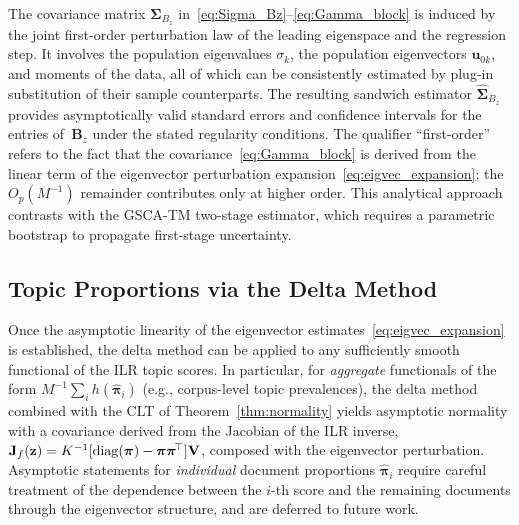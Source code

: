 \begin{remark}
\label{rem:no_bootstrap}
The covariance matrix $\boldsymbol{\Sigma}_{B_z}$
in~\eqref{eq:Sigma_Bz}--\eqref{eq:Gamma_block} is induced by the
joint first-order perturbation law of the leading eigenspace and
the regression step. It involves the population eigenvalues
$\sigma_k$, the population eigenvectors $\mathbf{u}_{0k}$, and
moments of the data, all of which can be consistently estimated by
plug-in substitution of their sample counterparts.
The resulting sandwich estimator
$\hat{\boldsymbol{\Sigma}}_{B_z}$ provides asymptotically valid
standard errors and confidence intervals for the entries
of~$\mathbf{B}_z$ under the stated regularity conditions.
The qualifier ``first-order'' refers to the fact that the
covariance~\eqref{eq:Gamma_block} is derived from the linear term
of the eigenvector perturbation expansion~\eqref{eq:eigvec_expansion};
the $O_p(M^{-1})$ remainder contributes only at higher order.
This analytical approach contrasts with the GSCA-TM two-stage
estimator, which requires a parametric bootstrap to propagate
first-stage uncertainty.
\end{remark}


\subsection{Topic Proportions via the Delta Method}
\label{subsec:delta_method}

\begin{remark}
\label{rem:pi_delta_method}
Once the asymptotic linearity of the eigenvector
estimates~\eqref{eq:eigvec_expansion} is established, the delta method
can be applied to any sufficiently smooth functional of the ILR topic
scores. In particular, for \emph{aggregate} functionals of the form
$M^{-1}\sum_i h(\hat{\boldsymbol{\pi}}_i)$ (e.g., corpus-level topic
prevalences), the delta method combined with the CLT
of Theorem~\ref{thm:normality} yields asymptotic normality with a
covariance derived from the Jacobian of the ILR inverse,
$\mathbf{J}_f(\mathbf{z}) = K^{-1}[\operatorname{diag}(\boldsymbol{\pi})
- \boldsymbol{\pi}\boldsymbol{\pi}^{\!\top}]\mathbf{V}$, composed with
the eigenvector perturbation. Asymptotic statements for \emph{individual}
document proportions $\hat{\boldsymbol{\pi}}_i$ require careful treatment
of the dependence between the $i$-th score and the remaining documents
through the eigenvector structure, and are deferred to future work.
\end{remark}


